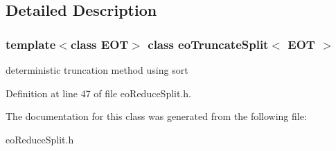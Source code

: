 \subsection{Detailed Description}
\subsubsection*{template$<$class EOT$>$ class eo\-Truncate\-Split$<$ EOT $>$}

deterministic truncation method using sort 



Definition at line 47 of file eo\-Reduce\-Split.h.

The documentation for this class was generated from the following file:\begin{CompactItemize}
\item 
eo\-Reduce\-Split.h\end{CompactItemize}
